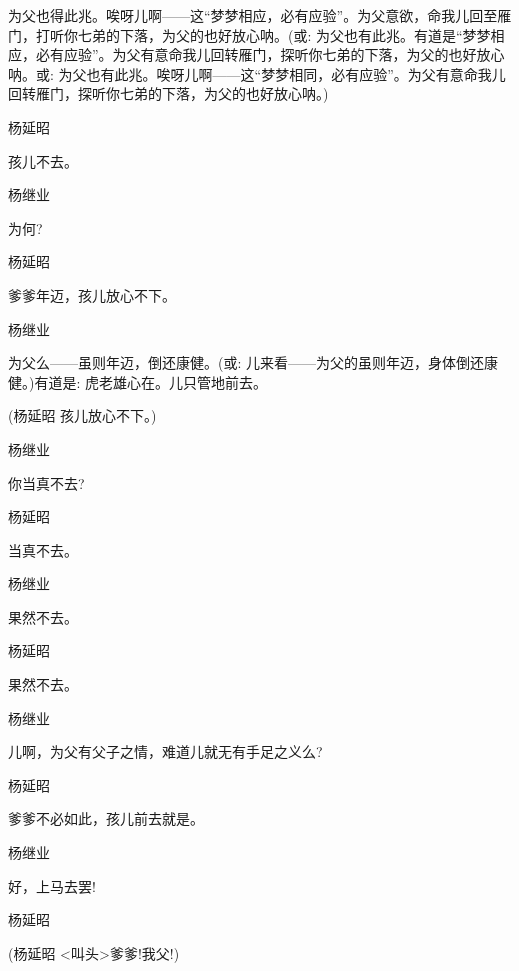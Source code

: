 {{为父也得此兆。唉呀儿啊------这``梦梦相应，必有应验''。为父意欲，命我儿回至雁门，打听你七弟的下落，为父的也好放心呐。({\akai 或}: 为父也有此兆。有道是``梦梦相应，必有应验''。为父有意命我儿回转雁门，探听你七弟的下落，为父的也好放心呐。或: 为父也有此兆。唉呀儿啊------这``梦梦相同，必有应验''。为父有意命我儿回转雁门，探听你七弟的下落，为父的也好放心呐。)}

{杨延昭\hspace{20pt}~

孩儿不去。}

{杨继业\hspace{20pt}~

为何?}

{杨延昭\hspace{20pt}~

爹爹年迈，孩儿放心不下。}

{杨继业

为父么------虽则年迈，倒还康健。({\akai 或}: 儿来看------为父的虽则年迈，身体倒还康健。)有道是: 虎老雄心在。儿只管地前去。}

{(杨延昭 孩儿放心不下。)}

{杨继业\hspace{20pt}~

你当真不去?}

{杨延昭\hspace{20pt}~

当真不去。}

{杨继业\hspace{20pt}~

果然不去。}

{杨延昭\hspace{20pt}~

果然不去。}

{杨继业\hspace{20pt}~

儿啊，为父有父子之情，难道儿就无有手足之义么?}

{杨延昭\hspace{20pt}~

爹爹不必如此，孩儿前去就是。}

{杨继业\hspace{20pt}~

好，上马去罢!}

{杨延昭

 }

{(杨延昭 \textless{}叫头\textgreater{}爹爹!我父!)}

}
